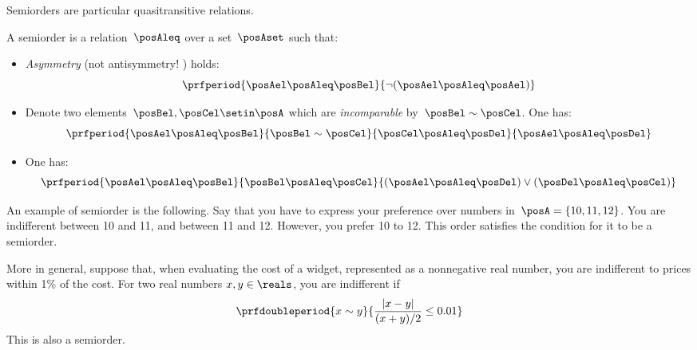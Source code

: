 Semiorders are particular quasitransitive relations.
\begin{definition}[Semiorder]

    A semiorder is a relation~$\posAleq$ over a set~$\posAset$ such that:
    \begin{itemize}
        \item \emph{Asymmetry} (not antisymmetry!
              ) holds:
              \begin{equation}
                  \prfperiod{\posAel \posAleq \posBel}{\neg(\posAel \posAleq \posAel)}
              \end{equation}
        \item Denote two elements~$\posBel, \posCel \setin \posA$ which are \emph{incomparable} by~$\posBel \sim \posCel$.
              One has:
              \begin{equation}
                  \prfperiod{\posAel \posAleq \posBel}{\posBel \sim \posCel}{\posCel \posAleq \posDel}{\posAel \posAleq \posDel}
              \end{equation}
        \item One has:
              \begin{equation}
                  \prfperiod{\posAel \posAleq \posBel}{\posBel \posAleq \posCel}{(\posAel \posAleq \posDel) \vee (\posDel \posAleq \posCel)}
              \end{equation}
    \end{itemize}

\end{definition}
\begin{example}
    An example of semiorder is the following.
    Say that you have to express your preference over numbers in~$\posA=\{10,11,12\}$.
    You are indifferent between 10 and 11, and between 11 and 12.
    However, you prefer 10 to 12.
    This order satisfies the condition for it to be a semiorder.

    More in general, suppose that, when evaluating the cost of a widget, represented as a nonnegative real number, you are indifferent to prices within 1\% of the cost.
    For two real numbers $x,y\in\reals$, you are indifferent if
    \begin{equation}
        \prfdoubleperiod{
            x \sim y
        }{
            \frac{| x - y |}{ (x+y)/2} \leq 0.01
        }
    \end{equation}
    This is also a semiorder.
\end{example}

